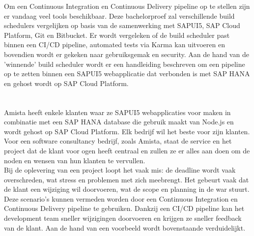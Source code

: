 Om een Continuous Integration en Continuous Delivery pipeline op te stellen zijn er vandaag veel tools beschikbaar.
Deze bachelorproef zal verschillende build schedulers vergelijken op basis van de samenwerking met SAPUI5, SAP Cloud Platform, Git en Bitbucket. Er wordt vergeleken of de build scheduler past binnen een CI/CD pipeline, automated tests via Karma kan uitvoeren en bovendien wordt er gekeken naar gebruiksgemak en security.
Aan de hand van de 'winnende' build scheduler wordt er een handleiding beschreven om een pipeline op te zetten binnen een SAPUI5 webapplicatie dat verbonden is met SAP HANA en gehost wordt op SAP Cloud Platform.

\section{}
\label{sec:probleemstelling}
Amista heeft enkele klanten waar ze SAPUI5 webapplicaties voor maken in combinatie met een SAP HANA database die gebruik maakt van Node.js en wordt gehost op SAP Cloud Platform.
Elk bedrijf wil het beste voor zijn klanten. Voor een software consultancy bedrijf, zoals Amista, staat de service en het project dat de klant voor ogen heeft centraal en zullen ze er alles aan doen om de noden en wensen van hun klanten te vervullen.\\
Bij de oplevering van een project loopt het vaak mis: de deadline wordt vaak overschreden, wat stress en problemen met zich meebrengt. Het gebeurt vaak dat de klant een wijziging wil doorvoeren, wat de scope en planning in de war stuurt. Deze scenario's kunnen vermeden worden door een Continuous Integration en Continuous Delivery pipeline te gebruiken. Dankzij een CI/CD pipeline kan het development team sneller wijzigingen doorvoeren en krijgen ze sneller feedback van de klant. Aan de hand van een voorbeeld wordt bovenstaande verduidelijkt.


